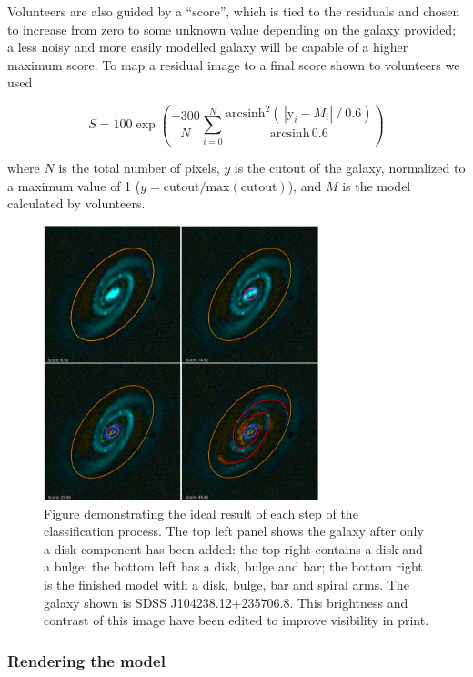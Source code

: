 \documentclass[../main.tex]{subfiles}
\begin{document}
Volunteers are also guided by a ``score'', which is tied to the residuals and chosen to increase from zero to some unknown value depending on the galaxy provided; a less noisy and more easily modelled galaxy will be capable of a higher maximum score. To map a residual image to a final score shown to volunteers we used

\begin{equation*}
    S = 100 \exp\left(\frac{-300}{N}\sum_{i=0}^N\frac{\text{arcsinh}^2\left(\,|\text{y}_i - M_i|\ /\ 0.6\right)}{\text{arcsinh}\,0.6 }\right)
\end{equation*}

where $N$ is the total number of pixels, $y$ is the cutout of the galaxy, normalized to a maximum value of 1 ($y = \text{cutout}/\text{max}(\text{cutout})$), and $M$ is the model calculated by volunteers.


\begin{figure}
  \includegraphics[width=8cm]{images/residualProgress.jpg}
  \caption{Figure demonstrating the ideal result of each step of the classification process. The top left panel shows the galaxy after only a disk component has been added: the top right contains a disk and a bulge; the bottom left has a disk, bulge and bar; the bottom right is the finished model with a disk, bulge, bar and spiral arms. The galaxy shown is SDSS J104238.12+235706.8. This brightness and contrast of this image have been edited to improve visibility in print.}
  \label{fig:residualsStepByStep}
\end{figure}

\subsubsection{Rendering the model}
\end{document}
